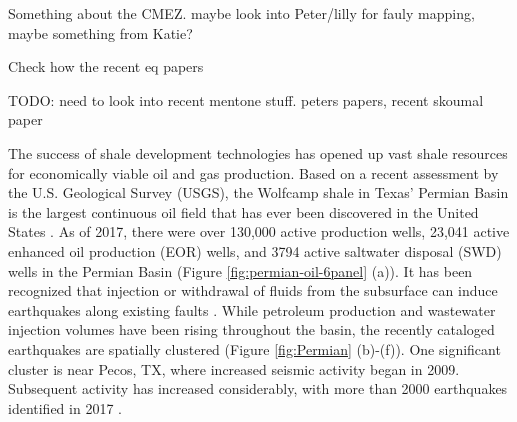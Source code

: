 Something about the CMEZ. maybe look into Peter/lilly for fauly mapping, maybe something from Katie?

Check how the recent eq papers 

TODO: need to look into recent mentone stuff. peters papers, recent skoumal paper



The success of shale development technologies \citep{Waters2006Spe103202Ms} has opened up vast shale resources for economically viable oil and gas production. Based on a recent assessment by the U.S. Geological Survey (USGS), the Wolfcamp shale in Texas' Permian Basin is the largest continuous oil field that has ever been discovered in the United States \citep{GaswirthAssessment2016} . As of 2017, there were over 130,000 active production wells, 23,041 active enhanced oil production (EOR) wells, and 3794 active saltwater disposal (SWD) wells in the Permian Basin (Figure \ref{fig:permian-oil-6panel} (a)). It has been recognized that injection or withdrawal of fluids from the subsurface can induce earthquakes along existing faults \citep{Ellsworth2013, simpson1988two}. While petroleum production and wastewater injection volumes have been rising throughout the basin, the recently cataloged earthquakes are spatially clustered (Figure \ref{fig:Permian} (b)-(f)). One significant cluster is near Pecos, TX, where increased seismic activity began in 2009. Subsequent activity has increased considerably, with more than 2000 earthquakes identified in 2017 \citep{Frohlich2019}.




